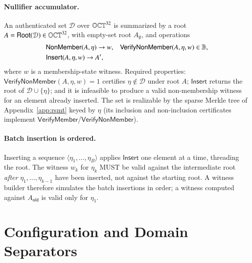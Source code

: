 \paragraph{Nullifier accumulator.}
An authenticated set $\mathcal{D}$ over $\mathbb{OCT}^{32}$ is summarized by a root $A = \mathsf{Root}(\mathcal{D}) \in \mathbb{OCT}^{32}$, with empty-set root $A_\emptyset$, and operations
\[
\begin{aligned}
&\mathsf{NonMember}(A,\eta) \to w, &&\mathsf{VerifyNonMember}(A,\eta,w) \in \mathbb{B},\\
&\mathsf{Insert}(A,\eta,w) \to A',
\end{aligned}
\]
where $w$ is a membership-state witness. Required properties: $\mathsf{VerifyNonMember}(A,\eta,w)=1$ certifies $\eta \notin \mathcal{D}$ under root $A$; $\mathsf{Insert}$ returns the root of $\mathcal{D}\cup\{\eta\}$; and it is infeasible to produce a valid non-membership witness for an element already inserted. The set is realizable by the sparse Merkle tree of Appendix~\ref{app:rsmt} keyed by $\eta$ (its inclusion and non-inclusion certificates implement $\mathsf{VerifyMember}$/$\mathsf{VerifyNonMember}$).

\paragraph{Batch insertion is ordered.}
Inserting a sequence $\langle\eta_1,\ldots,\eta_B\rangle$ applies $\mathsf{Insert}$ one element at a time, threading the root. The witness $w_k$ for $\eta_k$ MUST be valid against the intermediate root \emph{after} $\eta_1,\ldots,\eta_{k-1}$ have been inserted, not against the starting root. A witness builder therefore simulates the batch insertions in order; a witness computed against $A_\mathsf{old}$ is valid only for $\eta_1$.

\section{Configuration and Domain Separators}\label{app:bridging-config}


